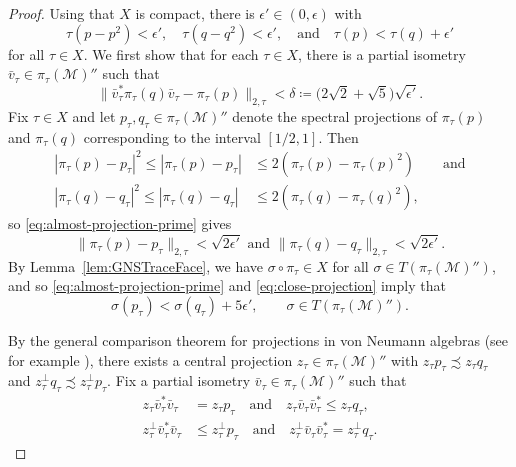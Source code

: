 \documentclass[a4paper,11pt]{amsart}
\theoremstyle{definition}
\numberwithin{equation}{section}
\numberwithin{theorem}{section}
\newcommand{\M}{\mathcal{M}}
\begin{document}
\begin{proof}
	Using that $X$ is compact, there is $\epsilon' \in (0, \epsilon)$ with 
	\begin{equation}\label{eq:almost-projection-prime}
		\tau(p - p^2) < \epsilon', \quad \tau(q - q^2) < \epsilon', \quad \text{and} \quad \tau(p) < \tau(q) + \epsilon'
	\end{equation}
	for all $\tau \in X$.	We first show that for each $\tau \in X$, there is a partial isometry $\bar v_\tau \in \pi_\tau(\M)''$ such that
	\begin{equation}\label{eq:vN-approx-subequiv}
		\| \bar v_\tau^* \pi_\tau(q) \bar v_\tau - \pi_\tau(p) \|_{2, \tau} < \delta \coloneqq \big(2 \sqrt{2} + \sqrt{5}\big)\sqrt{\epsilon'}.
	\end{equation}
	Fix $\tau \in X$ and let $p_\tau, q_\tau \in \pi_\tau(\M)''$ denote the spectral projections of $\pi_\tau(p)$ and $\pi_\tau(q)$ corresponding to the interval $[1/2, 1]$.  Then
	\begin{equation}\begin{split}\label{eq:close-projection}
|\pi_\tau(p)-p_\tau|^2\leq	|\pi_\tau(p) - p_\tau| &\leq 2(\pi_\tau(p) - \pi_\tau(p)^2) \qquad \text{and}  \\
		|\pi_\tau(q)-q_\tau|^2\leq|\pi_\tau(q) - q_\tau| &\leq 2(\pi_\tau(q) - \pi_\tau(q)^2),
	\end{split}\end{equation}
 so \eqref{eq:almost-projection-prime} gives
 \begin{equation}\label{eq:lem:approx-comparison-neweq1}
\|\pi_\tau(p)-p_\tau\|_{2,\tau} < \sqrt{2\epsilon'}\text{ and }\|\pi_\tau(q)-q_\tau\|_{2,\tau} < \sqrt{2\epsilon'}.
 \end{equation}
	By Lemma~\ref{lem:GNSTraceFace}, we have $\sigma \circ \pi_\tau \in X$ for all $\sigma \in T(\pi_\tau(\M)'')$, and so  \eqref{eq:almost-projection-prime} and \eqref{eq:close-projection} imply that 
	\begin{equation}\label{eq:almost-smaller-trace}
		\sigma(p_\tau) < \sigma(q_\tau) + 5\epsilon', \qquad \sigma \in T(\pi_\tau(\M)'').
	\end{equation}
	
	By the general comparison theorem for projections in von Neumann algebras (see for example \cite[Theorem V.1.8]{Tak79}), there exists a central projection $z_\tau \in \pi_\tau(\M)''$ with $z_\tau p_\tau \precsim z_\tau q_\tau$ and $z_\tau^\perp q_\tau \precsim z_\tau^\perp p_\tau$. Fix a partial isometry $\bar v_\tau \in \pi_\tau(\M)''$ such that
	\begin{align}
		\label{eqn:underZ} z_\tau \bar v_\tau^* \bar v_\tau &= z_\tau p_\tau \quad \text{and} \quad z_\tau \bar v_\tau \bar v_\tau^* \leq z_\tau q_\tau, \\
		\label{eqn:underZperp}	z_\tau^\perp \bar v_\tau^* \bar v_\tau &\leq z_\tau^\perp p_\tau \quad \text{and} \quad 	z_\tau^\perp \bar v_\tau \bar v_\tau^* = z_\tau^\perp q_\tau.
	\end{align}
	

\end{proof}
\end{document}
